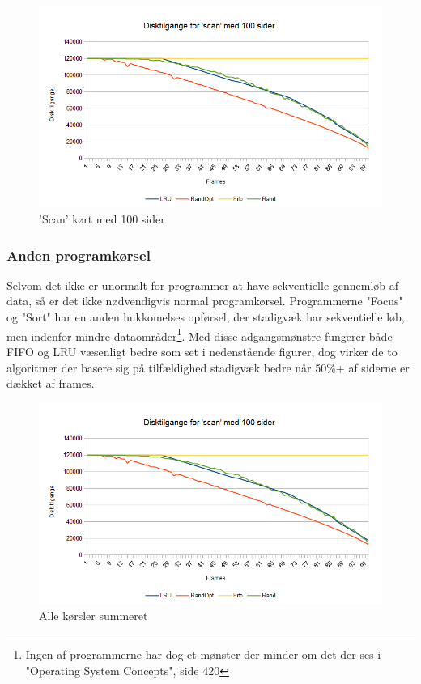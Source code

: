 \begin{figure}[ht]
\centerline{\includegraphics[scale=1]{graph/stat_scan}}
\FloatBarrier
\caption{'Scan' kørt med 100 sider}
\label{fig:scan}
\end{figure}

\subsubsection{Anden programkørsel}
Selvom det ikke er unormalt for programmer at have sekventielle gennemløb af data, så er det ikke nødvendigvis normal programkørsel. Programmerne "Focus" og "Sort" har en anden hukkomelses opførsel, der stadigvæk har sekventielle løb, men indenfor mindre dataområder\footnote{Ingen af programmerne har dog et mønster der minder om det der ses i "Operating System Concepts", side 420}. Med disse adgangsmønstre fungerer både FIFO og LRU væsenligt bedre som set i nedenstående figurer, dog virker de to algoritmer der basere sig på tilfældighed stadigvæk bedre når 50\%+ af siderne er dækket af frames. 

\begin{figure}[ht]
\centerline{\includegraphics[scale=1]{graph/stat_scan}}
\FloatBarrier
\caption{Alle kørsler summeret}
\label{fig:focus}
\end{figure}

